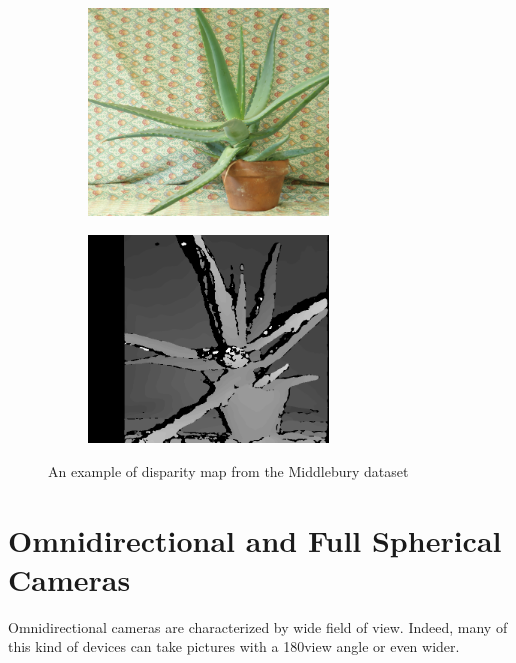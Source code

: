 \begin{figure}[h]
	\centering
	\begin{subfigure}{0.4\textwidth}
		\centering
		\includegraphics[width=0.7\textwidth]{img/aloe_view1}
	\end{subfigure}
	\begin{subfigure}{0.4\textwidth}
		\centering
		\includegraphics[width=0.7\textwidth]{img/aloe_disparity}
	\end{subfigure}
	\caption{\label{fig:disparity_example}An example of disparity map from the
	Middlebury dataset~\cite{hirschmuller2007evaluation}}
\end{figure}

\section{Omnidirectional and Full Spherical Cameras}
\label{sec:cameraclassification}
Omnidirectional cameras are characterized by wide field of view. Indeed, many of this kind of devices can take pictures with a 180\degree view angle or even wider.

